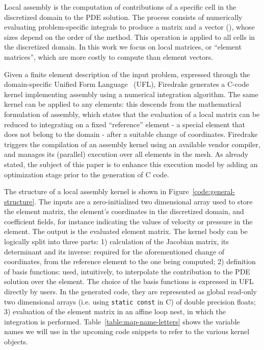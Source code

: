 \documentclass[conference]{IEEEtran}
\begin{document}
Local assembly is the computation of contributions of a specific cell in the discretized domain to the PDE solution. The process consists of numerically evaluating problem-specific integrals to produce a matrix and a vector (\cite{quadrature1, fluidity_manual_v4}), whose sizes depend on the order of the method. This operation is applied to all cells in the discretized domain. In this work we focus on local matrices, or ``element matrices'', which are more costly to compute than element vectors. 

Given a finite element description of the input problem, expressed through the domain-specific Unified Form Language~\cite{ufl} (UFL), Firedrake generates a C-code kernel implementing assembly using a numerical integration algorithm. The same kernel can be applied to any elements: this descends from the mathematical formulation of assembly, which states that the evaluation of a local matrix can be reduced to integrating on a fixed ``reference'' element - a special element that does not belong to the domain - after a suitable change of coordinates. Firedrake triggers the compilation of an assembly kernel using an available vendor compiler, and manages its (parallel) execution over all elements in the mesh. As already stated, the subject of this paper is to enhance this execution model by adding an optimization stage prior to the generation of C code. 


The structure of a local assembly kernel is shown in Figure~\ref{code:general-structure}. The inputs are a zero-initialized two dimensional array used to store the element matrix, the element's coordinates in the discretized domain, and coefficient fields, for instance indicating the values of velocity or pressure in the element. The output is the evaluated element matrix. The kernel body can be logically split into three parts: 1) calculation of the Jacobian matrix, its determinant and its inverse: required for the aforementioned change of coordinates, from the reference element to the one being computed; 2) definition of basis functions: used, intuitively, to interpolate the contribution to the PDE solution over the element. The choice of the basis functions is expressed in UFL directly by users. In the generated code, they are represented as global read-only two dimensional arrays (i.e. using \texttt{static const} in C) of double precision floats; 3) evaluation of the element matrix in an affine loop nest, in which the integration is performed. Table~\ref{table:map-name-letters} shows the variable names we will use in the upcoming code snippets to refer to the various kernel objects.
\end{document}
